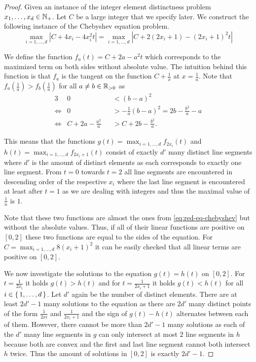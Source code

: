 \begin{proof}
	Given an instance of the integer element distinctness problem \(x_1, \dots, x_d \in \mathbb{N}_+\). Let \(C\) be a large integer that we specify later. We construct the following instance of the Chebyshev equation problem. 
	\begin{equation}\label{eq:red-eq-chebyshev}
		\max_{i=1, \dots, d} |C + 4x_i - 4x_i^2 t| = \max_{i=1, \dots, d} |C + 2(2x_i + 1) - (2x_i+1)^2 t|
	\end{equation}	

	We define the function \(f_a(t) = C + 2a - a^2 t\) which corresponds to the maximized term on both sides without absolute value. The intuition behind this function is that \(f_a\) is the tangent on the function \(C + \frac{1}{x}\) at \(x = \frac{1}{a}\). Note that \(f_a(\frac{1}{a}) > f_b(\frac{1}{a})\) for all \(a \neq b \in \mathbb{R}_{> 0}\) as 
	\begin{alignat*}{3}
		& 0 &&< (b-a)^2 \\
		\iff & 0 &&> -\frac{1}{a}(b-a)^2 =  2b -\frac{b^2}{a} - a \\
		\iff & C + 2a - \frac{a^2}{a} &&> C + 2b -\frac{b^2}{a}.
	\end{alignat*}

	This means that the functions \(g(t) = \max_{i=1,\dots, d} f_{2x_i}(t)\) and \(h(t) = \max_{i=1,\dots, d} f_{2x_i+1}(t)\) consist of exactly \(d'\) many distinct line segments where \(d'\) is the amount of distinct elements as each corresponds to exactly one line segment. From \(t=0\) towards \(t = 2\) all line segments are encountered in descending order of the respective \(x_i\) where the last line segment is encountered at least after \(t=1\) as we are dealing with integers and thus the maximal value of \(\frac{1}{n}\) is \(1\). 

	Note that these two functions are almost the ones from \cref{eq:red-eq-chebyshev} but without the absolute values. Thus, if all of their linear functions are positive on \([0,2]\) these two functions are equal to the sides of the equation. For \(C = \max_{i=1, \dots, d}8(x_i+1)^2\) it can be easily checked that all linear terms are positive on \([0, 2]\).

	We now investigate the solutions to the equation \(g(t) = h(t)\) on \([0, 2]\). For \(t = \frac{1}{2x_i}\) it holds \(g(t) > h(t)\) and for \(t = \frac{1}{2x_i + 1}\) it holds \(g(t) < h(t)\) for all \(i \in \set{1,\dots, d}\). Let \(d'\) again be the number of distinct elements. There are at least \(2d' - 1\) many solutions to the equation as there are \(2d'\) many distinct points of the form \(\frac{1}{2xi}\) and \(\frac{1}{2x_i+1}\) and the sign of \(g(t)-h(t)\) alternates between each of them. However, there cannot be more than \(2d'-1\) many solutions as each of the \(d'\) many line segments in \(g\) can only intersect at most \(2\) line segments in \(h\) because both are convex and the first and last line segment cannot both intersect \(h\) twice. Thus the amount of solutions in \([0,2]\) is exactly \(2d'-1\). 


\end{proof}
